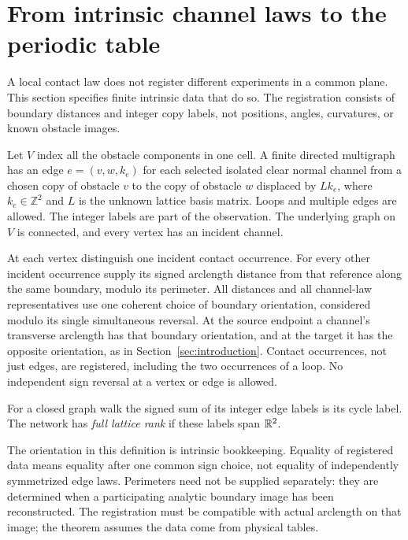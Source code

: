 \section{From intrinsic channel laws to the periodic table}
\label{sec:global}
A local contact law does not register different experiments in a common
plane. This section specifies finite intrinsic data that do so. The
registration consists of boundary distances and integer copy labels,
not positions, angles, curvatures, or known obstacle images.

\begin{definition}\label{def:network}
Let $V$ index all the obstacle components in one cell. A finite directed
multigraph has an edge $e=(v,w,k_e)$ for each selected isolated clear
normal channel from a chosen copy of obstacle $v$ to the copy of obstacle
$w$ displaced by $Lk_e$, where $k_e\in\mathbb Z^2$ and $L$ is the
unknown lattice basis matrix. Loops and multiple edges are allowed.
The integer labels are part of the observation. The underlying graph
on $V$ is connected, and every vertex has an incident channel.

At each vertex distinguish one incident contact occurrence. For every
other incident occurrence supply its signed arclength distance from that
reference along the same boundary, modulo its perimeter. All distances
and all channel-law representatives use one coherent choice of boundary
orientation, considered modulo its single simultaneous reversal. At the
source endpoint a channel's transverse arclength has that boundary
orientation, and at the target it has the opposite orientation, as in
Section~\ref{sec:introduction}. Contact occurrences, not just edges,
are registered, including the two occurrences of a loop. No independent
sign reversal at a vertex or edge is allowed.

For a closed graph walk the signed sum of its integer edge labels is
its cycle label. The network has \emph{full lattice rank} if these labels
span $\mathbb R^2$.
\end{definition}

The orientation in this definition is intrinsic bookkeeping. Equality
of registered data means equality after one common sign choice, not
equality of independently symmetrized edge laws. Perimeters need not
be supplied separately: they are determined when a participating
analytic boundary image has been reconstructed. The registration must
be compatible with actual arclength on that image; the theorem assumes
the data come from physical tables.


